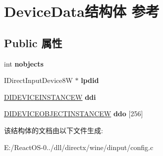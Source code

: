 \hypertarget{struct_device_data}{}\section{Device\+Data结构体 参考}
\label{struct_device_data}
\subsection*{Public 属性}
\begin{DoxyCompactItemize}
\item 
\mbox{\label{struct_device_data_a60085c24184c8b7faa8bc484f50fe27a}} 
int {\bfseries nobjects}
\item 
\mbox{\label{struct_device_data_abceab793a743d38133b7086002a021c8}} 
I\+Direct\+Input\+Device8W $\ast$ {\bfseries lpdid}
\item 
\mbox{\label{struct_device_data_ad77a9255d1338718cf9d1a5aa4bf95bd}} 
\hyperlink{struct_d_i_d_e_v_i_c_e_i_n_s_t_a_n_c_e_w}{D\+I\+D\+E\+V\+I\+C\+E\+I\+N\+S\+T\+A\+N\+C\+EW} {\bfseries ddi}
\item 
\mbox{\label{struct_device_data_ac6a46fb0bac99d46607573d644be58cf}} 
\hyperlink{struct_d_i_d_e_v_i_c_e_o_b_j_e_c_t_i_n_s_t_a_n_c_e_w}{D\+I\+D\+E\+V\+I\+C\+E\+O\+B\+J\+E\+C\+T\+I\+N\+S\+T\+A\+N\+C\+EW} {\bfseries ddo} \mbox{[}256\mbox{]}
\end{DoxyCompactItemize}


该结构体的文档由以下文件生成\+:\begin{DoxyCompactItemize}
\item 
E\+:/\+React\+O\+S-\/0../dll/directx/wine/dinput/config.\+c\end{DoxyCompactItemize}
